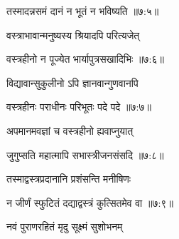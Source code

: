 
{\devanagarifont तस्मादन्नसमं दानं न भूतं न भविष्यति {॥७:५॥} \veg\dontdisplaylinenum }%



{\devanagarifont वस्त्राभावान्मनुष्यस्य श्रियादपि परित्यजेत् \thinspace{\dandab} \dontdisplaylinenum }%


{\devanagarifont वस्त्रहीनो न पूज्येत भार्यापुत्रसखादिभिः {॥७:६॥} \veg\dontdisplaylinenum }%
 
{\devanagarifont विद्यावान्सुकुलीनो ऽपि ज्ञानवान्गुणवानपि \thinspace{\dandab} \dontdisplaylinenum }%
 

{\devanagarifont वस्त्रहीनः पराधीनः परिभूतः पदे पदे {॥७:७॥} \veg\dontdisplaylinenum }%
 
{\devanagarifont अपमानमवज्ञां च वस्त्रहीनो ह्यवाप्नुयात् \thinspace{\dandab} \dontdisplaylinenum }%


{\devanagarifont जुगुप्सति महात्मापि सभास्त्रीजनसंसदि {॥७:८॥} \veg\dontdisplaylinenum }%
 
{\devanagarifont तस्माद्वस्त्रप्रदानानि प्रशंसन्ति मनीषिणः \thinspace{\dandab} \dontdisplaylinenum }%
 

{\devanagarifont न जीर्णं स्फुटितं दद्याद्वस्त्रं कुत्सितमेव वा {॥७:९॥} \veg\dontdisplaylinenum }%

{\devanagarifont नवं पुराणरहितं मृदु सूक्ष्मं सुशोभनम् \thinspace{\dandab} \dontdisplaylinenum }%

